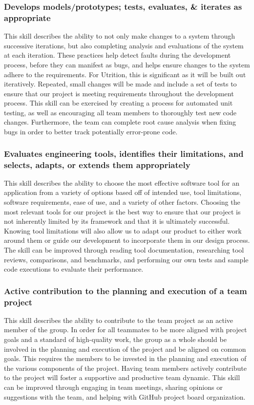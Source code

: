 \documentclass[12pt]{article}
\begin{document}
\subsubsection{Develops models/prototypes; tests, evaluates, \& iterates as 
appropriate}
This skill describes the ability to not only make changes to a system through 
successive iterations, but also completing analysis and evaluations of the 
system at each iteration. These practices help detect faults during the 
development process, before they can manifest as bugs, and helps ensure changes 
to the system adhere to the requirements. For Utrition, this is significant as 
it will be built out iteratively. Repeated, small changes will be made and 
include a set of tests to ensure that our project is meeting requirements 
throughout the development process. This skill can be exercised by creating a 
process for automated unit testing, as well as encouraging all team members to thoroughly test new code changes. Furthermore, the team can complete root cause 
analysis when fixing bugs in order to better track potentially error-prone code.

\subsubsection{Evaluates engineering tools, identifies their limitations, and selects, adapts, or extends them appropriately}
This skill describes the ability to choose the most effective software tool for an application from a variety of options based off of intended use, tool limitations, software requirements, ease of use, and a variety of other factors. Choosing the most relevant tools for our project is the best way to ensure that our project is not inherently limited by its framework and that it is ultimately successful. Knowing tool limitations will also allow us to adapt our product to either work around them or guide our development to incorporate them in our design process. The skill can be improved through reading tool documentation, researching tool reviews, comparisons, and benchmarks, and performing our own tests and sample code executions to evaluate their performance. 

\subsubsection{Active contribution to the planning and execution of a team project}
This skill describes the ability to contribute to the team project as an active member of the group. In order for all teammates to be more aligned with project goals and a standard of high-quality work, the group as a whole should be involved in the planning and execution of the project and be aligned on common goals. This requires the members to be invested in the planning and execution of the various components of the project. Having team members actively contribute to the project will foster a supportive and productive team dynamic. This skill can be improved through engaging in team meetings, sharing opinions or suggestions with the team, and helping with GitHub project board organization.
\end{document}
